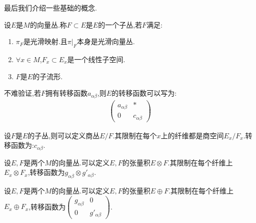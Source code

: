 最后我们介绍一些基础的概念.
\begin{definition}[子丛,商丛,张量积与直和]
	设$E$是$M$的向量丛.称$F\subset E$是$E$的一个子丛,若$F$满足:
	\begin{enumerate}
		\item $\pi_F$是光滑映射.且$\pi|_F$本身是光滑向量丛.
		\item $\forall x \in M$,$F_x \subset E_x$是一个线性子空间.
		\item $F$是$E$的子流形.
	\end{enumerate}

	不难验证,若$F$拥有转移函数$a_{\alpha\beta}$,则$E$的转移函数可以写为:
	\begin{align*}
		\begin{pmatrix}
			a_{\alpha\beta}&*\\
			0&c_{\alpha\beta}
		\end{pmatrix}
	\end{align*}

	设$F$是$E$的子丛,则可以定义商丛$E/F$.其限制在每个$x$上的纤维都是商空间$E_x/F_x$.转移函数为:$c_{\alpha\beta}$.

	设$E,F$是两个$M$的向量丛.可以定义$E,F$的张量积$E\otimes F$.其限制在每个纤维上$E_x\otimes F_x$,转移函数为$g_{\alpha\beta}\otimes g'_{\alpha\beta}$.

	设$E,F$是两个$M$的向量丛.可以定义$E,F$的张量积$E\oplus F$.其限制在每个纤维上$E_x\oplus F_x$,转移函数为$\begin{pmatrix}g_{\alpha\beta}&0\\0&g'_{\alpha\beta}\end{pmatrix}$.
\end{definition}
